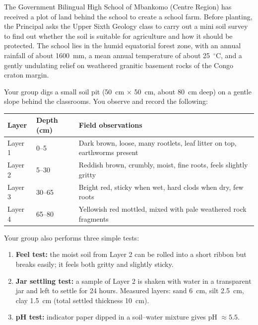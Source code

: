 \documentclass[11pt]{article}
\newcommand{\cle}[1]{{\popxbold\color{popdark}#1}}
\newcounter{popsec}
\newcounter{popsub}
\newcommand{\courssub}[1]{%
  \stepcounter{popsub}%
  \par\vspace{9pt}\noindent{\popxbold\fontsize{11.5}{13}\selectfont\color{popink}{\color{poporange}\thepopsec.\thepopsub}\hspace{6pt}#1}\par\nopagebreak\vspace{4pt}
}
\begin{document}
\courssub{Situation}

The Government Bilingual High School of Mbankomo (Centre Region) has received a plot of land behind the school to create a school farm. Before planting, the Principal asks the Upper Sixth Geology class to carry out a \cle{mini soil survey} to find out whether the soil is suitable for agriculture and how it should be protected. The school lies in the humid equatorial forest zone, with an annual rainfall of about \SI{1600}{mm}, a mean annual temperature of about \SI{25}{\ensuremath{{}^{\circ}\mathrm{C}}}, and a gently undulating relief on weathered \cle{granitic} basement rocks of the Congo craton margin.

Your group digs a small soil pit (\SI{50}{cm} $\times$ \SI{50}{cm}, about \SI{80}{cm} deep) on a gentle slope behind the classrooms. You observe and record the following:

\begin{center}
\begin{tabularx}{\linewidth}{|l|X|X|}
\hline
\rowcolor{popblueL} \textbf{Layer} & \textbf{Depth (cm)} & \textbf{Field observations} \\
\hline
Layer 1 & 0--5 & Dark brown, loose, many rootlets, leaf litter on top, earthworms present \\
\hline
Layer 2 & 5--30 & Reddish brown, crumbly, moist, fine roots, feels slightly gritty \\
\hline
Layer 3 & 30--65 & Bright red, sticky when wet, hard clods when dry, few roots \\
\hline
Layer 4 & 65--80 & Yellowish red mottled, mixed with pale weathered rock fragments \\
\hline
\end{tabularx}
\end{center}

Your group also performs three simple tests:

\begin{enumerate}
\item \textbf{Feel test:} the moist soil from Layer 2 can be rolled into a short ribbon but breaks easily; it feels both gritty and slightly sticky.
\item \textbf{Jar settling test:} a sample of Layer 2 is shaken with water in a transparent jar and left to settle for 24 hours. Measured layers: sand \SI{6}{cm}, silt \SI{2.5}{cm}, clay \SI{1.5}{cm} (total settled thickness \SI{10}{cm}).
\item \textbf{pH test:} indicator paper dipped in a soil--water mixture gives pH $\approx 5.5$.
\end{enumerate}
\end{document}
